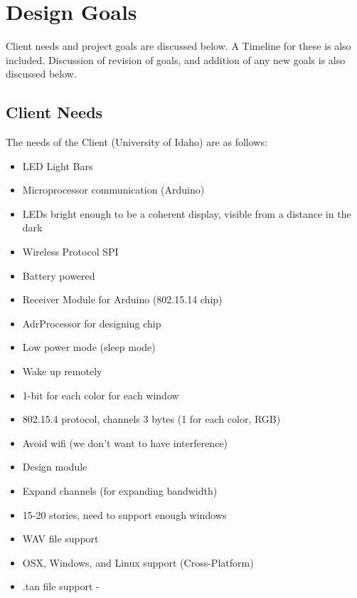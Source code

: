 \documentclass[12pt]{article}
\begin{document}
{{  
\section{Design Goals}
	Client needs and project goals are discussed below. A Timeline for these is also included. Discussion of revision of goals, and addition of any new goals is also discussed below.
	
	\subsection{Client Needs}
	The needs of the Client (University of Idaho) are as follows:
		
		\begin{itemize}
			\item LED Light Bars
			\item Microprocessor communication (Arduino)
			\item LEDs bright enough to be a coherent display, visible from a distance in the dark
			\item Wireless Protocol SPI
			\item Battery powered
			\item Receiver Module for Arduino (802.15.14 chip) 
			\item AdrProcessor for designing chip
			\item Low power mode (sleep mode)
			\item Wake up remotely
			\item 1-bit for each color for each window
			\item 802.15.4 protocol, channels 3 bytes (1 for each color, RGB)
			\item Avoid wifi (we don't want to have interference)
			\item Design module
			\item Expand channels (for expanding bandwidth)
			\item 15-20 stories, need to support enough windows
			\item WAV file support
			\item OSX, Windows, and Linux support (Cross-Platform)
			\item .tan file support - 
		\end{itemize}
	
}}
\end{document}
